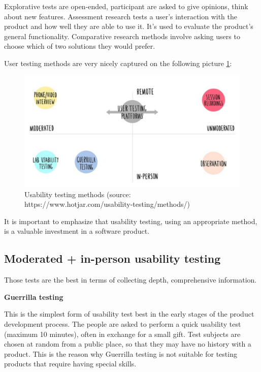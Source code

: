 \documentclass[a4paper,10pt,twoside]{article}
\begin{document}
\noindent Explorative tests are open-ended, participant are asked to give opinions, think about new features. Assessment research tests a user's interaction with the product and how well they are able to use it.  It's used to evaluate the product's general functionality. Comparative research methods involve asking users to choose which of two solutions they would prefer.

\noindent User testing methods are very nicely captured on the following picture \ref{fig:usability_testing_methods}:

\vspace{0.3cm}
\begin{figure}[hbt!] 
\begin{center}
\includegraphics[width=17cm]{../pictures/usability_testing_methods.png} 
\caption[Usability testing methods]{Usability testing methods (source: https://www.hotjar.com/usability-testing/methods/)}
\label{fig:usability_testing_methods}
\end{center}
\end{figure}

\noindent It is important to emphasize that usability testing, using an appropriate method, is a valuable investment in a software product.
 
\subsection{Moderated + in-person usability testing}
Those tests are the best  in terms of collecting depth, comprehensive information. 
\smallskip

\noindent \textbf {Guerrilla testing}

\noindent This is the simplest form of usability test best in the early stages of the product development process. The people are asked to perform a quick usability test (maximum 10 minutes), often in exchange for a small gift. Test subjects are chosen at random from a public place, so that they may have no history with a product. This is the reason why Guerrilla testing is not suitable for testing products that require having special skills.
\end{document}
